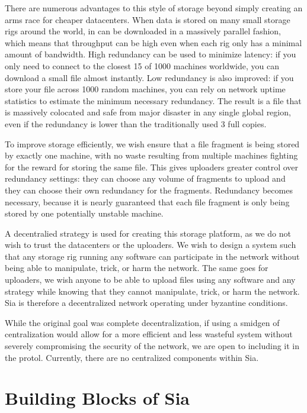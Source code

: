 \documentclass[twocolumn]{article}
\begin{document}
There are numerous advantages to this style of storage beyond simply creating an arms race for cheaper datacenters.
When data is stored on many small storage rigs around the world, in can be downloaded in a massively parallel fashion, which means that throughput can be high even when each rig only has a minimal amount of bandwidth.
High redundancy can be used to minimize latency: if you only need to connect to the closest 15 of 1000 machines worldwide, you can download a small file almost instantly.
Low redundancy is also improved: if you store your file across 1000 random machines, you can rely on network uptime statistics to estimate the minimum necessary redundancy.
The result is a file that is massively colocated and safe from major disaster in any single global region, even if the redundancy is lower than the traditionally used 3 full copies.

To improve storage efficiently, we wish ensure that a file fragment is being stored by exactly one machine, with no waste resulting from multiple machines fighting for the reward for storing the same file.
This gives uploaders greater control over redundancy settings: they can choose any volume of fragments to upload and they can choose their own redundancy for the fragments.
Redundancy becomes necessary, because it is nearly guaranteed that each file fragment is only being stored by one potentially unstable machine.

A decentralied strategy is used for creating this storage platform, as we do not wish to trust the datacenters or the uploaders.
We wish to design a system such that any storage rig running any software can participate in the network without being able to manipulate, trick, or harm the network.
The same goes for uploaders, we wish anyone to be able to upload files using any software and any strategy while knowing that they cannot manipulate, trick, or harm the network.
Sia is therefore a decentralized network operating under byzantine conditions.

While the original goal was complete decentralization, if using a smidgen of centralization would allow for a more efficient and less wasteful system without severely compromising the security of the network, we are open to including it in the protol.
Currently, there are no centralized components within Sia.

\section{Building Blocks of Sia}
\end{document}
